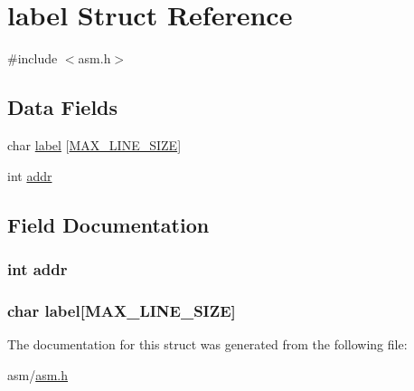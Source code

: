 \hypertarget{structlabel}{}\section{label Struct Reference}
\label{structlabel}


{\ttfamily \#include $<$asm.\+h$>$}

\subsection*{Data Fields}
\begin{DoxyCompactItemize}
\item 
char \hyperlink{structlabel_aedfa2cebe85a7a3bce74cef7c10f9582}{label} \mbox{[}\hyperlink{asm_8h_a706068f562dd5c64a8b7bbd4b2298dd1}{M\+A\+X\+\_\+\+L\+I\+N\+E\+\_\+\+S\+I\+ZE}\mbox{]}
\item 
int \hyperlink{structlabel_aafb8164f20f79a2dd0290502a25367d1}{addr}
\end{DoxyCompactItemize}


\subsection{Field Documentation}
\subsubsection[{\texorpdfstring{addr}{addr}}]{\setlength{\rightskip}{0pt plus 5cm}int addr}\hypertarget{structlabel_aafb8164f20f79a2dd0290502a25367d1}{}\label{structlabel_aafb8164f20f79a2dd0290502a25367d1}
\subsubsection[{\texorpdfstring{label}{label}}]{\setlength{\rightskip}{0pt plus 5cm}char {\bf label}\mbox{[}{\bf M\+A\+X\+\_\+\+L\+I\+N\+E\+\_\+\+S\+I\+ZE}\mbox{]}}\hypertarget{structlabel_aedfa2cebe85a7a3bce74cef7c10f9582}{}\label{structlabel_aedfa2cebe85a7a3bce74cef7c10f9582}


The documentation for this struct was generated from the following file\+:\begin{DoxyCompactItemize}
\item 
asm/\hyperlink{asm_8h}{asm.\+h}\end{DoxyCompactItemize}
